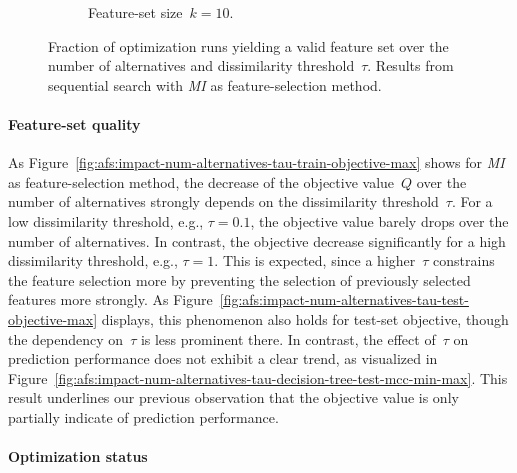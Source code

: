 \documentclass{article}
\theoremstyle{definition}
\begin{document}
\begin{figure}[htbp]
\begin{subfigure}[t]{0.48\textwidth}
		\caption{Feature-set size~$k=10$.}
		\label{fig:afs:impact-num-alternatives-tau-optimization-status-k-10}
	\end{subfigure}
	\caption{
		Fraction of optimization runs yielding a valid feature set over the number of alternatives and dissimilarity threshold~$\tau$.
		Results from sequential search with \emph{MI} as feature-selection method.
	}
	\label{fig:afs:impact-num-alternatives-tau-optimization-status}
\end{figure}

\paragraph{Feature-set quality}

As Figure~\ref{fig:afs:impact-num-alternatives-tau-train-objective-max} shows for \emph{MI} as feature-selection method, the decrease of the objective value~$Q$ over the number of alternatives strongly depends on the dissimilarity threshold~$\tau$.
For a low dissimilarity threshold, e.g., $\tau=0.1$, the objective value barely drops over the number of alternatives.
In contrast, the objective decrease significantly for a high dissimilarity threshold, e.g., $\tau=1$.
This is expected, since a higher~$\tau$ constrains the feature selection more by preventing the selection of previously selected features more strongly. 
As Figure~\ref{fig:afs:impact-num-alternatives-tau-test-objective-max} displays, this phenomenon also holds for test-set objective, though the dependency on~$\tau$ is less prominent there.
In contrast, the effect of~$\tau$ on prediction performance does not exhibit a clear trend, as visualized in Figure~\ref{fig:afs:impact-num-alternatives-tau-decision-tree-test-mcc-min-max}.
This result underlines our previous observation that the objective value is only partially indicate of prediction performance.

\paragraph{Optimization status}
\end{document}
